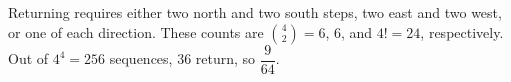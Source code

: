 Returning requires either two north and two south steps, two east and two west, or one of each direction. These counts are $\binom42=6$, $6$, and $4!=24$, respectively. Out of $4^4=256$ sequences, $36$ return, so $\boxed{\dfrac{9}{64}}$.
